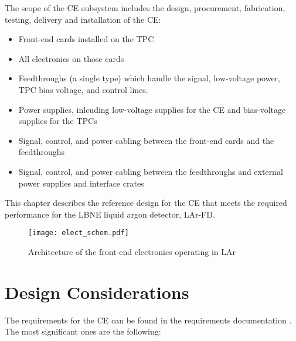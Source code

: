 The scope of the CE subsystem includes the design, procurement, fabrication, testing,
delivery and installation of the CE:
\begin{itemize}
\item Front-end cards installed on the TPC
\item All electronics on those cards
\item Feedthroughs (a single type) which handle the signal, low-voltage power, TPC bias voltage, and control lines.
\item Power supplies, inlcuding low-voltage supplies for the CE and bias-voltage supplies for the TPCs
\item Signal, control, and power cabling between the front-end cards and the feedthroughs
\item Signal, control, and power cabling between the feedthroughs and external power supplies and interface crates
\end{itemize}
This chapter describes the reference design for the CE that meets the required performance for the LBNE liquid argon detector,
LAr-FD.
 
\begin{figure}[htbp]
\centering
\texttt{[image: elect\_schem.pdf]}
\caption{Architecture of the front-end electronics operating in LAr}
\label{fig:ce-elec-schematic}
\end{figure}

\section{Design Considerations} 
\label{sec:ce-reqs-n-specs}

The requirements for the CE can be found in the requirements documentation \cite{lar-fd-req}.
The most significant ones are the following:

